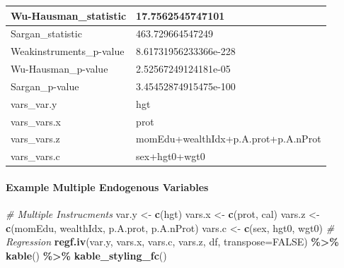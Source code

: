 \documentclass[
]{book}
\newenvironment{Shaded}{\begin{snugshade}}{\end{snugshade}}
\newcommand{\CommentTok}[1]{\textcolor[rgb]{0.56,0.35,0.01}{\textit{#1}}}
\newcommand{\DataTypeTok}[1]{\textcolor[rgb]{0.13,0.29,0.53}{#1}}
\newcommand{\KeywordTok}[1]{\textcolor[rgb]{0.13,0.29,0.53}{\textbf{#1}}}
\newcommand{\NormalTok}[1]{#1}
\newcommand{\OperatorTok}[1]{\textcolor[rgb]{0.81,0.36,0.00}{\textbf{#1}}}
\newcommand{\OtherTok}[1]{\textcolor[rgb]{0.56,0.35,0.01}{#1}}
\newcommand{\StringTok}[1]{\textcolor[rgb]{0.31,0.60,0.02}{#1}}
\begin{document}
\begin{table}[!h]
\begin{tabular}{l|l}
\hline
\rowcolor{gray!6}  Wu-Hausman\_statistic & 17.7562545747101\\
\hline
Sargan\_statistic & 463.729664547249\\
\hline
\rowcolor{gray!6}  Weakinstruments\_p-value & 8.61731956233366e-228\\
\hline
Wu-Hausman\_p-value & 2.52567249124181e-05\\
\hline
\rowcolor{gray!6}  Sargan\_p-value & 3.45452874915475e-100\\
\hline
vars\_var.y & hgt\\
\hline
\rowcolor{gray!6}  vars\_vars.x & prot\\
\hline
vars\_vars.z & momEdu+wealthIdx+p.A.prot+p.A.nProt\\
\hline
\rowcolor{gray!6}  vars\_vars.c & sex+hgt0+wgt0\\
\hline
\end{tabular}
\end{table}

\hypertarget{example-multiple-endogenous-variables}{%
\paragraph{Example Multiple Endogenous Variables}\label{example-multiple-endogenous-variables}}

\begin{Shaded}
\begin{Highlighting}[]
\CommentTok{\# Multiple Instrucments}
\NormalTok{var.y \textless{}{-}}\StringTok{ }\KeywordTok{c}\NormalTok{(}\StringTok{\textquotesingle{}hgt\textquotesingle{}}\NormalTok{)}
\NormalTok{vars.x \textless{}{-}}\StringTok{ }\KeywordTok{c}\NormalTok{(}\StringTok{\textquotesingle{}prot\textquotesingle{}}\NormalTok{, }\StringTok{\textquotesingle{}cal\textquotesingle{}}\NormalTok{)}
\NormalTok{vars.z \textless{}{-}}\StringTok{ }\KeywordTok{c}\NormalTok{(}\StringTok{\textquotesingle{}momEdu\textquotesingle{}}\NormalTok{, }\StringTok{\textquotesingle{}wealthIdx\textquotesingle{}}\NormalTok{, }\StringTok{\textquotesingle{}p.A.prot\textquotesingle{}}\NormalTok{, }\StringTok{\textquotesingle{}p.A.nProt\textquotesingle{}}\NormalTok{)}
\NormalTok{vars.c \textless{}{-}}\StringTok{ }\KeywordTok{c}\NormalTok{(}\StringTok{\textquotesingle{}sex\textquotesingle{}}\NormalTok{, }\StringTok{\textquotesingle{}hgt0\textquotesingle{}}\NormalTok{, }\StringTok{\textquotesingle{}wgt0\textquotesingle{}}\NormalTok{)}
\CommentTok{\# Regression}
\KeywordTok{regf.iv}\NormalTok{(var.y, vars.x, vars.c, vars.z, df, }\DataTypeTok{transpose=}\OtherTok{FALSE}\NormalTok{) }\OperatorTok{\%\textgreater{}\%}
\StringTok{  }\KeywordTok{kable}\NormalTok{() }\OperatorTok{\%\textgreater{}\%}
\StringTok{  }\KeywordTok{kable\_styling\_fc}\NormalTok{()}
\end{Highlighting}
\end{Shaded}
\end{document}
